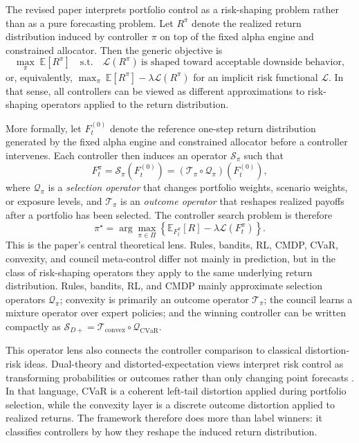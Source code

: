 \documentclass[11pt]{article}
\begin{document}
The revised paper interprets portfolio control as a risk-shaping problem rather
than as a pure forecasting problem. Let $R^\pi$ denote the realized return
distribution induced by controller $\pi$ on top of the fixed alpha engine and
constrained allocator. Then the generic objective is
\[
\max_{\pi} \; \mathbb{E}[R^\pi]
\quad \text{s.t.} \quad
\mathcal{L}(R^\pi)\ \text{is shaped toward acceptable downside behavior},
\]
or, equivalently, $\max_{\pi}\ \mathbb{E}[R^\pi]-\lambda\mathcal{L}(R^\pi)$ for
an implicit risk functional $\mathcal{L}$. In that sense, all controllers can
be viewed as different approximations to risk-shaping operators applied to the
return distribution.

More formally, let $F_t^{(0)}$ denote the reference one-step return
distribution generated by the fixed alpha engine and constrained allocator
before a controller intervenes. Each controller then induces an operator
$\mathcal{S}_\pi$ such that
\[
F_t^\pi = \mathcal{S}_\pi\!\left(F_t^{(0)}\right)
= \left(\mathcal{T}_\pi \circ \mathcal{Q}_\pi\right)\!\left(F_t^{(0)}\right),
\]
where $\mathcal{Q}_\pi$ is a \emph{selection operator} that changes portfolio
weights, scenario weights, or exposure levels, and $\mathcal{T}_\pi$ is an
\emph{outcome operator} that reshapes realized payoffs after a portfolio has
been selected. The controller search problem is therefore
\[
\pi^\star = \arg\max_{\pi \in \Pi}
\left\{
\mathbb{E}_{F_t^\pi}[R] - \lambda \mathcal{L}(F_t^\pi)
\right\}.
\]
This is the paper's central theoretical lens. Rules, bandits, RL, CMDP, CVaR,
convexity, and council meta-control differ not mainly in prediction, but in the
class of risk-shaping operators they apply to the same underlying return
distribution. Rules, bandits, RL, and CMDP mainly approximate selection
operators $\mathcal{Q}_\pi$; convexity is primarily an outcome operator
$\mathcal{T}_\pi$; the council learns a mixture operator over expert policies;
and the winning controller can be written compactly as
$\mathcal{S}_{D+}=\mathcal{T}_{\text{convex}}\circ\mathcal{Q}_{\text{CVaR}}$.

This operator lens also connects the controller comparison to classical distortion-risk ideas. Dual-theory and distorted-expectation views interpret risk control as transforming probabilities or outcomes rather than only changing point forecasts \cite{yaari1987,schmeidler1989,wang2000}. In that language, CVaR is a coherent left-tail distortion applied during portfolio selection, while the convexity layer is a discrete outcome distortion applied to realized returns. The framework therefore does more than label winners: it classifies controllers by how they reshape the induced return distribution.
\end{document}
